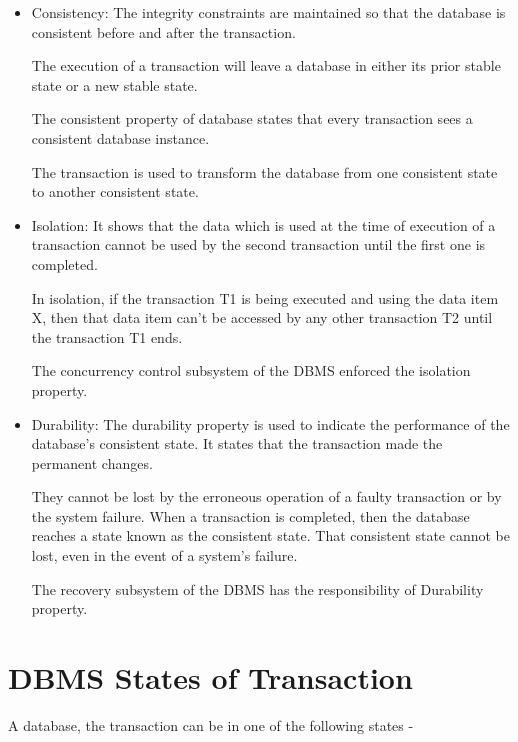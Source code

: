 \documentclass{article}
\begin{document}
\begin{itemize}
\item Consistency: The integrity constraints are maintained so that the database is consistent before and after the transaction.

The execution of a transaction will leave a database in either its prior stable state or a new stable state.

The consistent property of database states that every transaction sees a consistent database instance.

The transaction is used to transform the database from one consistent state to another consistent state.

\item Isolation: It shows that the data which is used at the time of execution of a transaction cannot be used by the second transaction until the first one is completed.

In isolation, if the transaction T1 is being executed and using the data item X, then that data item can't be accessed by any other transaction T2 until the transaction T1 ends.

The concurrency control subsystem of the DBMS enforced the isolation property.

\item Durability: The durability property is used to indicate the performance of the database's consistent state. It states that the transaction made the permanent changes.

They cannot be lost by the erroneous operation of a faulty transaction or by the system failure. When a transaction is completed, then the database reaches a state known as the consistent state. That consistent state cannot be lost, even in the event of a system's failure.

The recovery subsystem of the DBMS has the responsibility of Durability property.

 \end{itemize}


\section{DBMS States of Transaction}

A database, the transaction can be in one of the following states -
\end{document}
